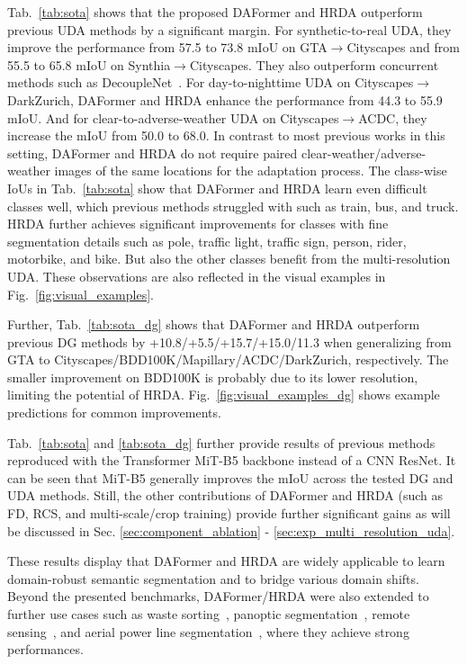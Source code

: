 \documentclass[journal,compsoc]{IEEEtran}
\begin{document}
Tab.~\ref{tab:sota} shows that the proposed DAFormer and HRDA outperform previous UDA methods by a significant margin.
For synthetic-to-real UDA, they improve the performance from 57.5 to 73.8 mIoU on GTA$\rightarrow$Cityscapes and from 55.5 to 65.8 mIoU on Synthia$\rightarrow$Cityscapes. They also outperform concurrent methods such as DecoupleNet~\cite{lai2022decouplenet}.
For day-to-nighttime UDA on Cityscapes$\to$DarkZurich, DAFormer and HRDA enhance the performance from 44.3 to 55.9 mIoU. And for clear-to-adverse-weather UDA on Cityscapes$\to$ACDC, they increase the mIoU from 50.0 to 68.0. In contrast to most previous works in this setting, DAFormer and HRDA do not require paired clear-weather/adverse-weather images of the same locations for the adaptation process.
The class-wise IoUs in Tab.~\ref{tab:sota} show that DAFormer and HRDA learn even difficult classes well, which previous methods struggled with such as train, bus, and truck. HRDA further achieves significant improvements for classes with fine segmentation details such as pole, traffic light, traffic sign, person, rider, motorbike, and bike. But also the other classes benefit from the multi-resolution UDA. These observations are also reflected in the visual examples in Fig.~\ref{fig:visual_examples}.


Further, Tab.~\ref{tab:sota_dg} shows that DAFormer and HRDA outperform previous DG methods by +10.8/\allowbreak +5.5/\allowbreak +15.7/+15.0/11.3 when generalizing from GTA to Cityscapes/\allowbreak BDD100K/\allowbreak Mapillary/\allowbreak ACDC/\allowbreak DarkZurich, respectively. The smaller improvement on BDD100K is probably due to its lower resolution, limiting the potential of HRDA. Fig.~\ref{fig:visual_examples_dg} shows example predictions for common improvements.

Tab.~\ref{tab:sota} and \ref{tab:sota_dg} further provide results of previous methods reproduced with the Transformer MiT-B5 backbone instead of a CNN ResNet. It can be seen that MiT-B5 generally improves the mIoU across the tested DG and UDA methods. Still, the other contributions of DAFormer and HRDA (such as FD, RCS, and multi-scale/crop training) provide further significant gains as will be discussed in Sec. \ref{sec:component_ablation} - \ref{sec:exp_multi_resolution_uda}.

These results display that DAFormer and HRDA are widely applicable to learn domain-robust semantic segmentation and to bridge various domain shifts.
Beyond the presented benchmarks, DAFormer/HRDA were also extended to further use cases such as 
waste sorting~\cite{bashkirova2023visda},
panoptic segmentation~\cite{saha2023edaps},
remote sensing~\cite{xia2023openearthmap}, and aerial power line segmentation~\cite{rao2022quadformer}, where they achieve strong performances.
\end{document}

